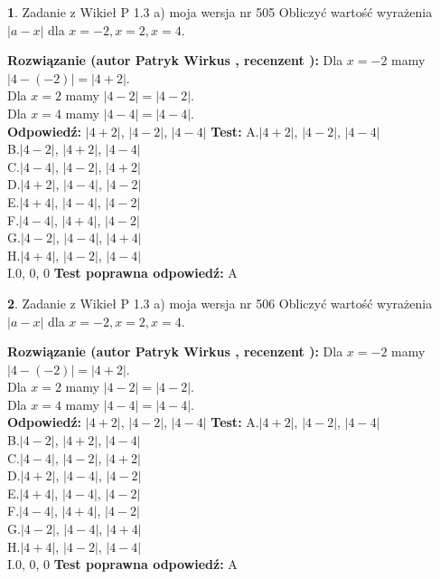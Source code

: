 \documentclass[12pt, a4paper]{article}
\theoremstyle{definition} %
\newtheorem{zad}{}
\newcommand{\zadStart}[1]{\begin{zad}#1\newline}
\newcommand{\zadStop}{\end{zad}}
\newcommand{\rozwStart}[2]{\noindent \textbf{Rozwiązanie (autor #1 , recenzent #2): }\newline}
\newcommand{\rozwStop}{\newline}
\newcommand{\odpStart}{\noindent \textbf{Odpowiedź:}\newline}
\newcommand{\odpStop}{\newline}
\newcommand{\testStart}{\noindent \textbf{Test:}\newline}
\newcommand{\testStop}{\newline}
\newcommand{\kluczStart}{\noindent \textbf{Test poprawna odpowiedź:}\newline}
\newcommand{\kluczStop}{\newline}
\begin{document}
\zadStart{Zadanie z Wikieł P 1.3 a) moja wersja nr 505}
Obliczyć wartość wyrażenia $|a - x|$ dla $x=-2,x=2,x=4$.
\zadStop
\rozwStart{Patryk Wirkus}{}
Dla $x = -2$ mamy $|4 - (-2)| = |4 + 2|$.\\
Dla $x = 2$ mamy $|4 - 2| = |4 - 2|$.\\
Dla $x = 4$ mamy $|4 - 4| = |4 - 4|$.\\
\rozwStop
\odpStart
$|4 + 2|$, $|4 - 2|$, $|4 - 4|$
\odpStop
\testStart
A.$|4 + 2|$, $|4 - 2|$, $|4 - 4|$\\
B.$|4 - 2|$, $|4 + 2|$, $|4 - 4|$\\
C.$|4 - 4|$, $|4 - 2|$, $|4 + 2|$\\
D.$|4 + 2|$, $|4 - 4|$, $|4 - 2|$\\
E.$|4 + 4|$, $|4 - 4|$, $|4 - 2|$\\
F.$|4 - 4|$, $|4 + 4|$, $|4 - 2|$\\
G.$|4 - 2|$, $|4 - 4|$, $|4 + 4|$\\
H.$|4 + 4|$, $|4 - 2|$, $|4 - 4|$\\
I.$0$, $0$, $0$
\testStop
\kluczStart
A
\kluczStop



\zadStart{Zadanie z Wikieł P 1.3 a) moja wersja nr 506}
Obliczyć wartość wyrażenia $|a - x|$ dla $x=-2,x=2,x=4$.
\zadStop
\rozwStart{Patryk Wirkus}{}
Dla $x = -2$ mamy $|4 - (-2)| = |4 + 2|$.\\
Dla $x = 2$ mamy $|4 - 2| = |4 - 2|$.\\
Dla $x = 4$ mamy $|4 - 4| = |4 - 4|$.\\
\rozwStop
\odpStart
$|4 + 2|$, $|4 - 2|$, $|4 - 4|$
\odpStop
\testStart
A.$|4 + 2|$, $|4 - 2|$, $|4 - 4|$\\
B.$|4 - 2|$, $|4 + 2|$, $|4 - 4|$\\
C.$|4 - 4|$, $|4 - 2|$, $|4 + 2|$\\
D.$|4 + 2|$, $|4 - 4|$, $|4 - 2|$\\
E.$|4 + 4|$, $|4 - 4|$, $|4 - 2|$\\
F.$|4 - 4|$, $|4 + 4|$, $|4 - 2|$\\
G.$|4 - 2|$, $|4 - 4|$, $|4 + 4|$\\
H.$|4 + 4|$, $|4 - 2|$, $|4 - 4|$\\
I.$0$, $0$, $0$
\testStop
\kluczStart
A
\kluczStop
\end{document}
